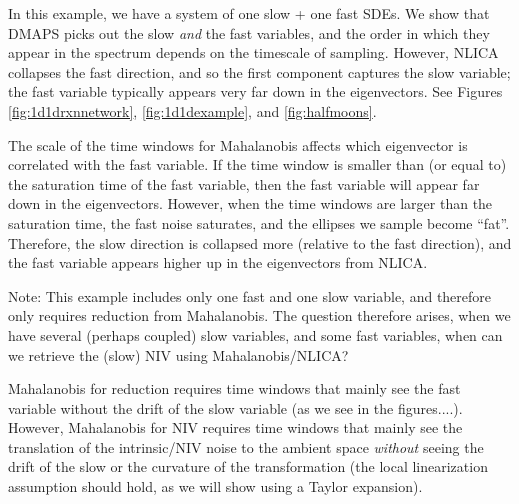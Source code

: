 \documentclass[12pt]{article}
\begin{document}
In this example, we have a system of one slow + one fast SDEs.
%
We show that DMAPS picks out the slow {\em and} the fast variables, and the order in which they appear in the spectrum depends on the timescale of sampling.
%
However, NLICA collapses the fast direction, and so the first component captures the slow variable; the fast variable typically appears very far down in the eigenvectors.
%
See Figures \ref{fig:1d1drxnnetwork}, \ref{fig:1d1dexample}, and \ref{fig:halfmoons}.

The scale of the time windows for Mahalanobis affects which eigenvector is correlated with the fast variable.
%
If the time window is smaller than (or equal to) the saturation time of the fast variable, then the fast variable will appear far down in the eigenvectors.
%
However, when the time windows are larger than the saturation time, the fast noise saturates, and the ellipses we sample become ``fat''.
%
Therefore, the slow direction is collapsed more (relative to the fast direction), and the fast variable appears higher up in the eigenvectors from NLICA.

Note: This example includes only one fast and one slow variable, and therefore only requires reduction from Mahalanobis.
%
The question therefore arises, when we have several (perhaps coupled) slow variables, and some fast variables, when can we retrieve the (slow) NIV using Mahalanobis/NLICA?

Mahalanobis for reduction requires time windows that mainly see the fast variable without the drift of the slow variable (as we see in the figures....).
%
However, Mahalanobis for NIV requires time windows that mainly see the translation of the intrinsic/NIV noise to the ambient space {\em without} seeing the drift of the slow or the curvature of the transformation (the local linearization assumption should hold, as we will show using a Taylor expansion). 
\end{document}
